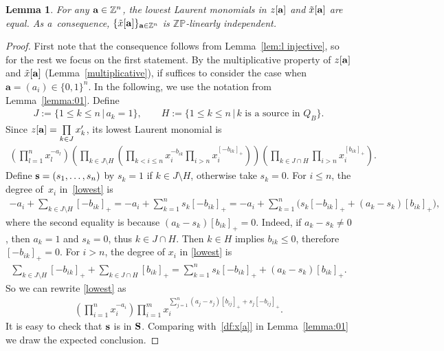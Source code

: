 \documentclass[pdftex]{sigma}
\numberwithin{equation}{section}
\newtheorem{Lemma}[Theorem]{Lemma}
\begin{document}
\begin{Lemma}\label{lem:lowest equal}
 For any ${\bf a} \in \mathbb{Z}^n$, the lowest Laurent monomials in $z[{\bf a}]$ and $\tilde{x}[{\bf a}]$ are equal. As a~consequence, $\{\tilde{x}[{\bf a}]\}_{{\bf a}\in\mathbb{Z}^n}$ is $\mathbb{ZP}$-linearly independent.
\end{Lemma}

\begin{proof}
First note that the consequence follows from Lemma~\ref{lem:l injective}, so for the rest we focus on the f\/irst statement.
By the multiplicative property of $z[{\bf a}]$ and $\tilde{x}[{\bf a}]$ (Lemma~\ref{multiplicative}), if suf\/f\/ices to consider the case when $\mathbf{a}=(a_i)\in \{0,1\}^n$. In the following, we use the notation from Lemma~\ref{lemma:01}. Def\/ine
\begin{gather*}
J:=\{1\le k\le n \,|\, a_k=1\},\qquad H:=\{1\le k\le n \,|\,  k\textrm{ is a source in } Q_B\}.
\end{gather*}
Since $z[{\bf a}]=\prod\limits_{k\in J} x'_k$, its lowest Laurent monomial is
\begin{gather}\label{lowest}
\left(\prod_{l=1}^n  x_l^{-a_l}\right)\left(\prod_{k\in J\setminus H} \left(\prod_{k < i \leq n} x_i^{-b_{ik}}\prod_{i>n} x_i^{[-b_{ik}]_+}\right) \right)\left( \prod_{k\in J\cap H} \prod_{i>n} x_i^{[b_{ik}]_+}\right).
\end{gather}
Def\/ine ${\bf s}=(s_1,\dots,s_n)$ by $s_k=1$ if $k\in J\setminus H$, otherwise take $s_k=0$.
 For $i\le n$, the degree of~$x_i$ in~\eqref{lowest} is
\begin{gather*}
-a_i+\sum_{k\in J\setminus H}[-b_{ik}]_+
=-a_i+\sum_{k=1}^ns_k[-b_{ik}]_+
=-a_i+
\sum_{k=1}^n \big(s_k[-b_{ik}]_++(a_k-s_k)[b_{ik}]_+\big),
\end{gather*}
where the second equality is because  $(a_k-s_k)[b_{ik}]_+=0$. Indeed, if $a_k-s_k\neq0$, then $a_k=1$ and $s_k=0$, thus $k\in J\cap H$. Then $k\in H$ implies $b_{ik}\le 0$,  therefore $[-b_{ik}]_+=0$.
For $i> n$, the degree of $x_i$ in \eqref{lowest} is
\begin{gather*}
\sum_{k\in J\setminus H}[-b_{ik}]_++\sum_{k\in J\cap H}[b_{ik}]_+
=\sum_{k=1}^ns_k[-b_{ik}]_++(a_k-s_k) [b_{ik}]_+.
\end{gather*}
So we can rewrite \eqref{lowest} as
\begin{gather*}
\left(\prod_{i=1}^n  x_i^{-a_i}\right)\prod_{i=1}^m
x_i^{\sum\limits_{j=1}^n (a_j-s_j)[b_{ij}]_+ + s_j[-b_{ij}]_+}.
\end{gather*}
It is easy to check that ${\bf s}$ is in ${\bf S}$. Comparing with~\eqref{df:x[a]} in Lemma~\ref{lemma:01} we draw the expected conclusion.
\end{proof}
\end{document}
